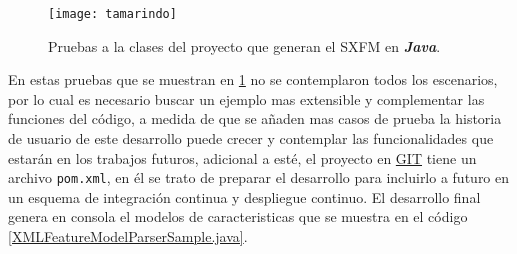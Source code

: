   \begin{figure}[h]
  	\centering
  	\texttt{[image: tamarindo]}
  	\caption{Pruebas a la clases del proyecto que generan el SXFM en \textbf{\textit{Java}}.}
  	\label{tamarindo}
  \end{figure}
 
 En estas pruebas que se muestran en \ref{tamarindo} no se contemplaron todos los escenarios, por lo cual es necesario buscar un ejemplo mas extensible y complementar las funciones del código, a medida de que se añaden mas casos de prueba la historia de usuario de este desarrollo puede crecer y contemplar las funcionalidades que estarán en los trabajos futuros, adicional a esté, el proyecto en \href{https://github.com/josepplloo/tamarindo}{GIT} tiene un archivo \texttt{pom.xml}, en él se trato de preparar el desarrollo para incluirlo a futuro en un esquema de integración continua y despliegue continuo.
 El desarrollo final genera en consola el modelos de caracteristicas que se muestra en el código \ref{XMLFeatureModelParserSample.java}.
 
